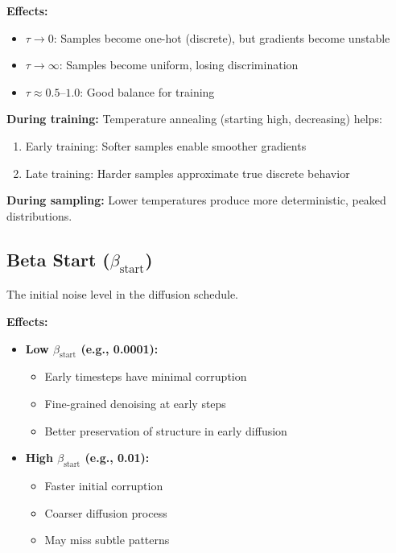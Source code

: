 \documentclass[11pt,a4paper]{article}
\begin{document}
\textbf{Effects:}
\begin{itemize}
    \item $\tau \rightarrow 0$: Samples become one-hot (discrete), but gradients become unstable
    \item $\tau \rightarrow \infty$: Samples become uniform, losing discrimination
    \item $\tau \approx 0.5$--$1.0$: Good balance for training
\end{itemize}

\textbf{During training:} Temperature annealing (starting high, decreasing) helps:
\begin{enumerate}
    \item Early training: Softer samples enable smoother gradients
    \item Late training: Harder samples approximate true discrete behavior
\end{enumerate}

\textbf{During sampling:} Lower temperatures produce more deterministic, peaked distributions.

\subsection{Beta Start ($\beta_{\text{start}}$)}

The initial noise level in the diffusion schedule.

\textbf{Effects:}
\begin{itemize}
    \item \textbf{Low $\beta_{\text{start}}$ (e.g., 0.0001):}
        \begin{itemize}
            \item Early timesteps have minimal corruption
            \item Fine-grained denoising at early steps
            \item Better preservation of structure in early diffusion
        \end{itemize}
    \item \textbf{High $\beta_{\text{start}}$ (e.g., 0.01):}
        \begin{itemize}
            \item Faster initial corruption
            \item Coarser diffusion process
            \item May miss subtle patterns
        \end{itemize}
\end{itemize}
\end{document}

